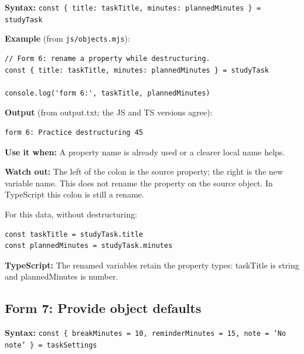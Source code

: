 \documentclass[10pt,a4paper]{article}
\begin{document}
\textbf{Syntax:} \texttt{const \{ title:\allowbreak{} task\allowbreak{}Title,\allowbreak{} minutes:\allowbreak{} planned\allowbreak{}Minutes \} =\allowbreak{} study\allowbreak{}Task}


\textbf{Example} (from \texttt{js/\allowbreak{}objects.\allowbreak{}mjs}):

\begin{lstlisting}[language=GuideJS]
// Form 6: rename a property while destructuring.
const { title: taskTitle, minutes: plannedMinutes } = studyTask

console.log('form 6:', taskTitle, plannedMinutes)
\end{lstlisting}


\textbf{Output} (from output.txt; the JS and TS versions agree):

\begin{lstlisting}[language={}]
form 6: Practice destructuring 45
\end{lstlisting}

\textbf{Use it when:} A property name is already used or a clearer local name helps.

\textbf{Watch out:} The left of the colon is the source property; the right is the new variable name. This does not rename the property on the source object. In TypeScript this colon is still a rename.


For this data, without destructuring:

\begin{lstlisting}[language=GuideJS]
const taskTitle = studyTask.title
const plannedMinutes = studyTask.minutes
\end{lstlisting}

\textbf{TypeScript:} The renamed variables retain the property types: taskTitle is string and plannedMinutes is number.

\subsection{Form 7: Provide object defaults}

\textbf{Syntax:} \texttt{const \{ break\allowbreak{}Minutes =\allowbreak{} 10,\allowbreak{} reminder\allowbreak{}Minutes =\allowbreak{} 15,\allowbreak{} note =\allowbreak{} 'No note' \} =\allowbreak{} task\allowbreak{}Settings}
\end{document}
